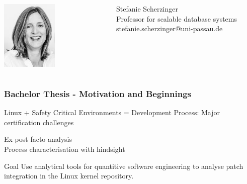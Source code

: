 \documentclass{beamer}
\begin{document}
\begin{frame}
\begin{minipage}[c]{1.0\linewidth}
\begin{columns}
\begin{column}{0.35\textwidth}
\begin{center}
     		\includegraphics[width=0.5\textwidth]{pics/speakers_scherzinger.jpeg}
			\end{center}
		\end{column}
		\begin{column}{1.0\textwidth}
			Stefanie Scherzinger\\Professor for scalable database systems\\stefanie.scherzinger@uni-passau.de
		\end{column}
		\end{columns}
	\end{minipage}
	\end{frame}

	\begin{frame}
	\frametitle{Bachelor Thesis - Motivation and Beginnings}
		\begin{block}{Linux + Safety Critical Environments}
			= Development Process: Major certification challenges
		\end{block}
		\Rightarrow Ex post facto analysis\\ %
		\Rightarrow Process characterisation with hindsight

		\begin{alertblock}{Goal}
			Use analytical tools for quantitive software engineering to analyse patch integration in the Linux kernel repository. %
		\end{alertblock}
	\end{frame}
\end{document}
